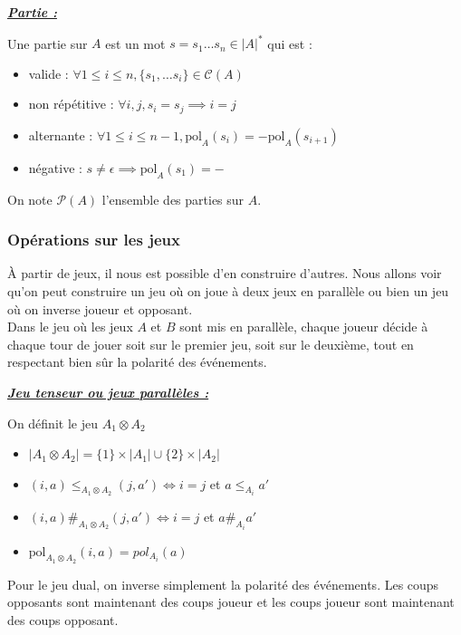 \documentclass[a4paper,12pt]{article}
\renewenvironment{leftbar}{
  \def\FrameCommand{\vrule width 1pt \hspace{10pt}}
  \MakeFramed {\advance\hsize-\width \FrameRestore}
\setlength{\parskip}{10pt}}
 {\endMakeFramed}
\newenvironment{answer}[1]
{
  \vspace{0.5cm} \noindent \begin{minipage}{\linewidth}
    \textbf{\textit{\uline{#1}}}
    \begin{leftbar}
}
{
    \end{leftbar}\end{minipage}\vspace{0.2cm}
}
\begin{document}
\begin{answer}{Partie :}
Une partie sur $A$ est un mot $s = s_1 \dots s_n \in |A|^*$ qui est :
\begin{itemize}
\item valide :
$\forall 1\leq i \leq n, \{s_1, \dots s_i\} \in \mathcal{C}(A)$

\item non répétitive :
$\forall i, j, s_i = s_j \implies i = j$

\item alternante :
$\forall 1 \leq i \leq n-1, \text{pol}_A(s_i) = - \text{pol}_A(s_{i+1})$

\item négative :
$s \neq \epsilon \implies \text{pol}_A(s_1) = -$
\end{itemize}
\end{answer}

On note $\mathcal{P}(A)$ l'ensemble des parties sur $A$.

\subsubsection{Opérations sur les jeux}

À partir de jeux, il nous est possible d'en construire d'autres.
Nous allons voir qu'on peut construire un jeu où on joue à deux jeux
en parallèle ou bien un jeu où on inverse joueur et opposant.
\\

Dans le jeu où les jeux $A$ et $B$ sont mis en parallèle, chaque joueur décide
à chaque tour de jouer soit sur le premier jeu, soit sur le deuxième, tout en
respectant bien sûr la polarité des événements.

\begin{answer}{Jeu tenseur ou jeux parallèles :}
On définit le jeu $A_1 \otimes A_2$
\begin{itemize}
\item $|A_1 \otimes A_2| = \{1\} \times |A_1| \cup \{2\} \times |A_2|$
\item $(i,a) \leq_{A_1 \otimes A_2} (j, a') \iff i = j $ et $a \leq_{A_i} a'$
\item $(i,a) \#_{A_1 \otimes A_2} (j,a') \iff i = j$ et $a \#_{A_i} a'$
\item $\text{pol}_{A_1 \otimes A_2}(i,a) = pol_{A_i} (a)$
\end{itemize}
\end{answer}

Pour le jeu dual, on inverse simplement la polarité des événements. Les coups
opposants sont maintenant des coups joueur et les coups joueur sont maintenant
des coups opposant.
\end{document}
